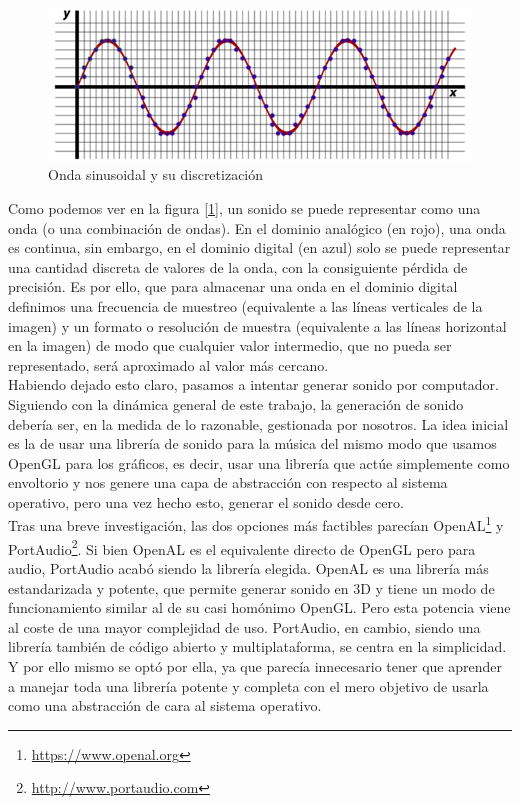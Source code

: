 \begin{figure}[h]
	\centering
	\includegraphics[width=13cm]{archivos/soundWave}
	\caption{Onda sinusoidal y su discretización}
	\label{fig:soundWave}
\end{figure}

Como podemos ver en la figura [\ref{fig:soundWave}], un sonido se puede representar como una onda (o una combinación de ondas). En el dominio analógico (en rojo), una onda es continua, sin embargo, en el dominio digital (en azul) solo se puede representar una cantidad discreta de valores de la onda, con la consiguiente pérdida de precisión. Es por ello, que para almacenar una onda en el dominio digital definimos una frecuencia de muestreo (equivalente a las líneas verticales de la imagen) y un formato o resolución de muestra (equivalente a las líneas horizontal en la imagen) de modo que cualquier valor intermedio, que no pueda ser representado, será aproximado al valor más cercano.\\

Habiendo dejado esto claro, pasamos a intentar generar sonido por computador. Siguiendo con la dinámica general de este trabajo, la generación de sonido debería ser, en la medida de lo razonable, gestionada por nosotros. La idea inicial es la de usar una librería de sonido para la música del mismo modo que usamos OpenGL para los gráficos, es decir, usar una librería que actúe simplemente como envoltorio y nos genere una capa de abstracción con respecto al sistema operativo, pero una vez hecho esto, generar el sonido desde cero.\\

Tras una breve investigación, las dos opciones más factibles parecían OpenAL\footnote{\url{https://www.openal.org}} y PortAudio\footnote{\url{http://www.portaudio.com}}. Si bien OpenAL es el equivalente directo de OpenGL pero para audio, PortAudio acabó siendo la librería elegida. OpenAL es una librería más estandarizada y potente, que permite generar sonido en 3D y tiene un modo de funcionamiento similar al de su casi homónimo OpenGL. Pero esta potencia viene al coste de una mayor complejidad de uso. PortAudio, en cambio, siendo una librería también de código abierto y multiplataforma, se centra en la simplicidad. Y por ello mismo se optó por ella, ya que parecía innecesario tener que aprender a manejar toda una librería potente y completa con el mero objetivo de usarla como una abstracción de cara al sistema operativo.\\

